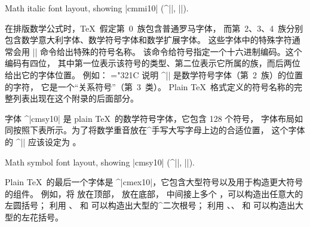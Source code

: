 \medskip\vfill
{}Math italic font layout,
showing |cmmi10| (^|\mit|, ||).
\beginchart\teni
\normalchart
\endchart

\noindent 在排版数学公式时，\TeX\ 假定第~0~族包含普通罗马字体，
而第~2、3、4~族分别包含数学意大利字体、数学符号字体和数学扩展字体。
这些字体中的特殊字符通常会用 |\mathchardef| 命令给出特殊的符号名称。
该命令给符号指定一个十六进制编码。这个编码有四位，
其中第一位表示该符号的类型、第二位表示它所属的族，而后两位给出它的字体位置。
例如：
\begintt
\mathchardef\ll="321C
\endtt
说明 ^|\ll| 是数学符号字体（第~2~族）的位置  的字符，
它是一个``关系符号''（第~3~类）。
Plain \TeX\ 格式定义的符号名称的完整列表出现在这个附录的后面部分。

\smallskip
字体 ^|cmsy10| 是 plain \TeX\ 的数学符号字体，它包含 128 个符号，
字体布局如同按照下表所示。为了将数学重音放在^{手写大写字母}上边的合适位置，
这个字体的 ^|\skewchar| 应该设定为 。

\medskip\vfill
{}Math symbol font layout,
showing |cmsy10| (^|\cal|, ||).
\beginchart\tensy
\normalchart
\endchart

Plain \TeX\ 的最后一个字体是 ^|cmex10|，它包含大型符号以及用于构造更大符号的组件。
例如，将  放在顶部， 放在底部，
中间接上多个 ，可以构造出任意大的左圆括号；
利用 、 和  可以构造出大型的^{二次根号}；
利用 、、 和  可以构造出大型的左花括号。

